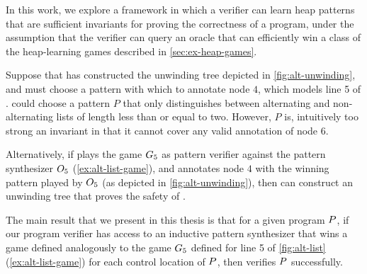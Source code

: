 In this work, we explore a framework in which a verifier can learn heap patterns that are sufficient invariants for proving the correctness of a program, under the assumption that the verifier can query an oracle that can efficiently win a class of the heap-learning games described in \autoref{sec:ex-heap-games}.
%
\begin{ex}
  \label{ex:alt-list-pat-syn}
  Suppose that \verifier has constructed the unwinding tree depicted
  in \autoref{fig:alt-unwinding}, and must choose a pattern with which
  to annotate node $4$, which models line 5 of \altlist.
  \verifier could choose a pattern $P$ that only distinguishes between
  alternating and non-alternating lists of length less than or equal
  to two.
  However, $P$ is, intuitively too strong an invariant in that it
  cannot cover any valid annotation of node $6$.

  Alternatively, if \verifier plays the game $G_5$ as pattern
  verifier against the pattern synthesizer $O_5$
  (\autoref{ex:alt-list-game}), and annotates node $4$ with the
  winning pattern played by $O_5$ (as depicted in
  \autoref{fig:alt-unwinding}), then \verifier can construct an
  unwinding tree that proves the safety of \altlist.
\end{ex}

The main result that we present in this thesis is that for a given
program $P$, if our program verifier \verifier has access to an
inductive pattern synthesizer that wins a game defined analogously to
the game $G_5$ defined for line 5 of \autoref{fig:alt-list}
(\autoref{ex:alt-list-game}) for each control location of $P$,
then \verifier verifies $P$ successfully.

